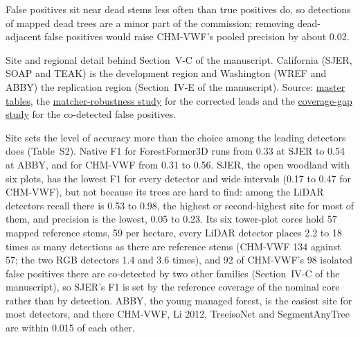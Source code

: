 \documentclass[10pt]{article}
\makeatletter
\newcommand\suppFloatBarrier{\par\addpenalty\z@
  \ifx\@deferlist\@empty\else\expandafter\supp@flush\fi}
\newcommand\supp@flush{\let\supp@waiting\@deferlist
  \newpage
  \ifx\@deferlist\supp@waiting\null\newpage\fi
  \ifx\@deferlist\supp@waiting\expandafter\clearpage\else\expandafter\suppFloatBarrier\fi}
\gdef\supp@afterheading{}
\renewcommand\section{\suppFloatBarrier
    \gdef\supp@afterheading{\suppressfloats[t]\gdef\supp@afterheading{}}\supp@section}}
\makeatother
\begin{document}
False positives sit near dead stems less often than true positives do, so
detections of mapped dead trees are a minor part of the commission; removing
dead-adjacent false positives would raise CHM-VWF's pooled precision by about
0.02.

\section*{S19. Accuracy by Region}

Site and regional detail behind Section~V-C of the manuscript. California (SJER,
SOAP and TEAK) is the development region and Washington (WREF and ABBY) the
replication region (Section~IV-E of the manuscript). Source: \href{https://github.com/devakellc/lidar-tree-benchmark/blob/main/results/master-tables-results.md}{master
tables}, the \href{https://github.com/devakellc/lidar-tree-benchmark/blob/main/results/matcher-robustness-results.md}{matcher-robustness
study} for the corrected leads and the
\href{https://github.com/devakellc/lidar-tree-benchmark/blob/main/results/coverage-gap-results.md}{coverage-gap study} for the co-detected
false positives.

Site sets the level of accuracy more than the choice among the leading detectors
does (Table~S2). Native F1 for ForestFormer3D runs from 0.33 at SJER to 0.54 at
ABBY, and for CHM-VWF from 0.31 to 0.56. SJER, the open woodland with six plots,
has the lowest F1 for every detector and wide intervals (0.17 to 0.47 for
CHM-VWF), but not because its trees are hard to find: among the LiDAR detectors
recall there is 0.53 to 0.98, the highest or second-highest site for most of
them, and precision is the lowest, 0.05 to 0.23. Its six tower-plot cores hold
57 mapped reference stems, 59 per hectare, every LiDAR detector places 2.2 to 18
times as many detections as there are reference stems (CHM-VWF 134 against 57;
the two RGB detectors 1.4 and 3.6 times), and 92 of CHM-VWF's 98 isolated false
positives there are co-detected by two other families (Section~IV-C of the
manuscript), so SJER's F1 is set by the reference coverage of the nominal core
rather than by detection. ABBY, the young managed forest, is the easiest site
for most detectors, and there CHM-VWF, Li 2012, TreeisoNet and SegmentAnyTree
are within 0.015 of each other.
\end{document}
